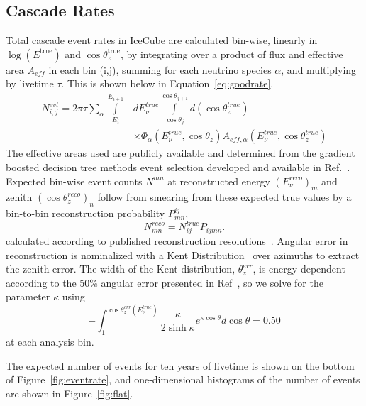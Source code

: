 \documentclass[main.tex]{subfiles}
\begin{document}
\subsection{\label{sub:cascade} Cascade Rates}

Total cascade event rates in IceCube are calculated bin-wise, linearly in $\log(E^{\text{true}})$ and $\cos\theta_{z}^{\text{true}}$, by integrating over a product of flux and effective area $A_{eff}$ in each bin (i,j), summing for each neutrino species \(\alpha\), and multiplying by livetime $\tau$. This is shown below in Equation~\ref{eq:goodrate}. 
\begin{equation}\label{eq:goodrate}\begin{split}
N^{evt}_{i,j} = 2\pi\tau\sum_{\alpha}\int\limits_{E_{i}}^{E_{i+1}} & dE^{true}_{\nu}\int\limits_{\cos\theta_{j}}^{\cos\theta_{j+1}} d(\cos\theta_{z}^{true})\\
& \times\Phi_{\alpha}(E_{\nu}^{true},\cos\theta_{z}) A_{eff, \alpha}(E_{\nu}^{true}, \cos\theta_{z}^{true})
\end{split}\end{equation}
The effective areas used are publicly available and determined from the gradient boosted decision tree methods event selection developed and available 
in Ref.~\cite{2018PhDT17N}.
Expected bin-wise event counts $N^{mn}$ at reconstructed energy $(E_{\nu}^{reco})_{m}$ and zenith $(\cos\theta_{z}^{reco})_{n}$ follow from smearing from these expected true values by a bin-to-bin reconstruction probability $P_{mn}^{ij}$,
\begin{equation}
N_{mn}^{reco}= N_{ij}^{true} P_{ijmn}.
\end{equation}
calculated according to published reconstruction resolutions~\cite{icecube_energy_reco, Aartsen_2017_monood}.
Angular error in reconstruction is nominalized with a Kent Distribution~\cite{10.2307/2984712} over azimuths to extract the zenith error.
The width of the Kent distribution, $\theta_{z}^{err}$, is energy-dependent according to the 50\% angular error presented in Ref~\cite{Aartsen_2017_monood}, so we solve for the parameter \(\kappa\) using
\begin{equation}
    -\int_{1}^{\cos\theta_{z}^{err}(E_{\nu}^{true})} \frac{\kappa}{2\sinh\kappa} e^{\kappa \cos\theta} d\cos\theta = 0.50
\end{equation}
at each analysis bin.

The expected number of events for ten years of livetime is shown on the bottom of Figure~\ref{fig:eventrate}, and one-dimensional histograms of the number of events are shown in Figure~\ref{fig:flat}. 
\end{document}
